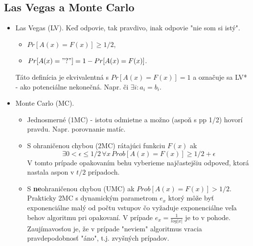 \documentclass[12pt,a4paper]{article}
\begin{document}
  \subsection{Las Vegas a Monte Carlo} 
  \begin{itemize} 
    \item Las Vegas (LV). Keď odpovie, tak pravdivo, inak odpovie "nie som si istý". 
      \begin{itemize}
        \item $Pr[A(x) = F(x)] \geq 1/2$, 
        \item $Pr[A(x) = "?"] = 1 - Pr[A(x) = F(x)]$. 
      \end{itemize} 
      Táto definícia je ekvivalentná s $Pr[A(x) = F(x)] = 1$ a označuje sa LV* - ako potenciálne nekonečná.
      Napr. či $\exists i : a_i = b_i$. 
    \item Monte Carlo (MC). 
    \begin{itemize} 
      \item Jednosmerné (1MC) - istotu odmietne a možno (aspoň s pp 1/2) hovorí pravdu. Napr. porovnanie matíc. 
      \item S ohraničenou chybou (2MC) rátajúci funkciu $F(x)$ ak $$
        \exists 0 < \epsilon \leq 1/2 \, \forall x \, Prob[A(x) = F(x)] \geq 1/2 + \epsilon
      $$
      V tomto prípade opakovaním behu vyberieme najčastejšiu odpoveď, ktorá nastala aspon v $t/2$ prípadoch. 
      \item S {\bf ne}ohraničenou chybou (UMC) ak $Prob[A(x) = F(x)] > 1/2$. Prakticky 2MC s dynamickým parametrom $e_x$ ktorý môže byť exponenciálne malý od počtu vstupov čo vyžaduje exponenciálne veľa behov algoritmu pri opakovaní. V prípade $e_x = \frac{1}{log|x|}$ je to v pohode. Zaujímavosťou je, že v prípade "neviem" algoritmus vracia pravdepodobnosť "áno", t.j. zvyšných prípadov. 
    \end{itemize} 
  \end{itemize} 
  
\end{document}
